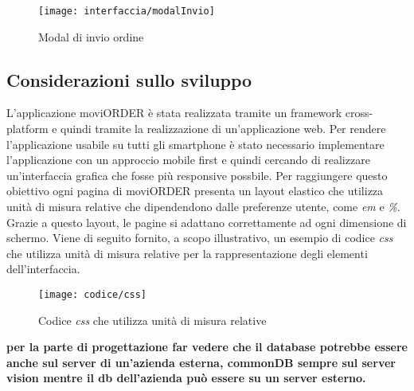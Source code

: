 \begin{figure}[!h] 
    \centering 
    \texttt{[image: interfaccia/modalInvio]} 
    \caption{Modal di invio ordine}
\end{figure}

\subsection{Considerazioni sullo sviluppo}

L'applicazione moviORDER è stata realizzata tramite un framework cross-platform e quindi tramite la realizzazione di un'applicazione web. Per rendere l'applicazione usabile su tutti gli smartphone è stato necessario implementare l'applicazione con un approccio mobile first e quindi cercando di realizzare un'interfaccia grafica che fosse più responsive possbile. Per raggiungere questo obiettivo ogni pagina di moviORDER presenta un layout elastico che utilizza unità di misura relative che dipendendono dalle preferenze utente, come \textit{em} e \textit{\%}. Grazie a questo layout, le pagine si adattano correttamente ad ogni dimensione di schermo. Viene di seguito fornito, a scopo illustrativo, un esempio di codice \textit{css} che utilizza unità di misura relative per la rappresentazione degli elementi dell'interfaccia.

\begin{figure}[!h] 
    \centering 
    \texttt{[image: codice/css]} 
    \caption{Codice \textit{css} che utilizza unità di misura relative}
\end{figure}


\textbf{per la parte di progettazione far vedere che il database potrebbe essere anche sul server di un'azienda esterna, commonDB sempre sul server vision mentre il db dell'azienda può essere su un server esterno.}
